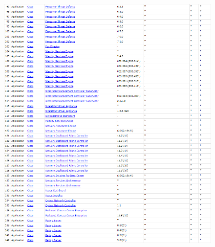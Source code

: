 \documentclass[11t]{article}
\begin{document}
\begin{figure}[H]
\begin{minipage}{0.49\textwidth}
    \end{minipage}
\end{figure}

\begin{figure}[H]
    \centering
    \begin{minipage}{0.49\textwidth}
        \centering
        \includegraphics[width=1\textwidth]{images/produtosAfetadosPergunta2_3.png}
    \end{minipage}
    \hfill
    \begin{minipage}{0.49\textwidth}
        \centering

\end{minipage}
\end{figure}
\end{document}
